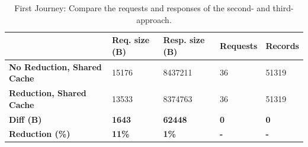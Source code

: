 \ifshowTables
\begin{table}[H]
  \begin{tabular}{|l|l|l|l|l|}
  \hline
  & \textbf{Req. size (B)} & \textbf{Resp. size (B)} & \textbf{Requests} & \textbf{Records} \\
  \hline
  \textbf{No Reduction, Shared Cache} & 15176 &  8437211 & 36 & 51319 \\
  \hline
  \textbf{Reduction, Shared Cache} &  13533 &  8374763 & 36 & 51319 \\
  \hline
  \hline
  \textbf{Diff (B)} & \textbf{1643} & \textbf{62448} & \textbf{0} & \textbf{0} \\
  \hline
  \textbf{Reduction (\%)} & \textbf{11\%} & \textbf{1\%} & \textbf{-} & \textbf{-} \\
  \hline
  \end{tabular}
  \caption{First Journey: Compare the requests and responses of the second- and third-approach.}\label{table:results:size-comparison-first-path-cache-no-reduction-cache-reduction}
\end{table}
\fi